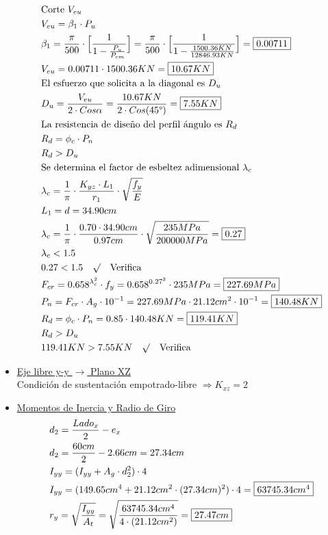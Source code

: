 \begin{itemize}
\begin{align*}
& \text{Corte } V_{eu} \\
& V_{eu} = \beta_1 \cdot P_u \\
& \beta_1 = \frac{\pi}{500} \cdot \Big[\frac{1}{1-\frac{P_u}{P_{cm}}} \Big] = \frac{\pi}{500} \cdot \Big[\frac{1}{1-\frac{1500.36KN}{12846.93KN}} \Big] = \framebox{$0.00711$}\\
& V_{eu} = 0.00711 \cdot 1500.36KN = \framebox{$10.67KN$} \\
& \text{El esfuerzo que solicita a la diagonal es } D_u \\
& D_u = \frac{V_{eu}}{2 \cdot Cos\alpha} = \frac{10.67KN}{2 \cdot Cos(45\text{°})} = \framebox{$7.55KN$} \\
& \text{La resistencia de diseño del perfil ángulo es } R_d \\
& R_d = \phi_c \cdot P_n \\
& R_d > D_u \\
& \text{Se determina el factor de esbeltez adimensional } \lambda_c \\
& \lambda_c = \frac{1}{\pi} \cdot \frac{K_{yz}\cdot L_1}{r_1} \cdot \sqrt{\frac{f_y}{E}} \\
& L_1 = d = 34.90cm \\
& \lambda_c = \frac{1}{\pi} \cdot \frac{0.70 \cdot 34.90cm}{0.97cm} \cdot \sqrt{\frac{235MPa}{200000MPa}} = \framebox{$0.27$} \\
& \lambda_c < 1.5 \\
& 0.27 < 1.5 \quad \surd \quad \text{Verifica} \\
& F_{cr} = 0.658^{\lambda_c^2} \cdot f_y = 0.658^{0.27^2} \cdot 235MPa = \framebox{$227.69MPa$}\\
& P_n = F_{cr} \cdot A_g \cdot 10^{-1} = 227.69MPa \cdot 21.12cm^2 \cdot 10^{-1} = \framebox{$140.48KN$} \\
& R_d = \phi_c \cdot P_n = 0.85 \cdot 140.48KN = \framebox{$119.41KN$} \\
& R_d > D_u \\
& 119.41KN > 7.55KN \quad \surd \quad \text{Verifica} \\
\end{align*}
\newpage
\item \underline{Eje libre y-y $\rightarrow$ Plano XZ}\\
Condición de sustentación empotrado-libre $\Rightarrow K_{xz} = 2$

\item \underline{Momentos de Inercia y Radio de Giro}
\begin{align*}
& d_2 = \frac{Lado_x}{2} - e_x \\
& d_2 = \frac{60cm}{2} - 2.66cm = 27.34cm\\
& I_{yy} = (I_{yy}+A_g \cdot d_2^2) \cdot 4\\
& I_{yy} = (149.65cm^4+21.12cm^2 \cdot (27.34cm)^2) \cdot 4 = \framebox{$63745.34cm^4$}\\
& r_y = \sqrt{\frac{I_{yy}}{A_t}} = \sqrt{\frac{63745.34cm^4}{4\cdot(21.12cm^2)}} = \framebox{$27.47cm$}
\end{align*}


\end{itemize}

